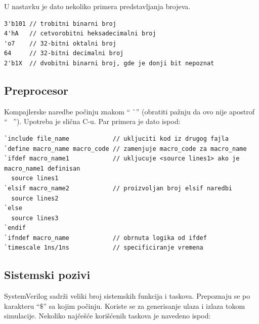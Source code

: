 U nastavku je dato nekoliko primera predstavljanja brojeva.

\begin{lstlisting}
3'b101 // trobitni binarni broj
4'hA   // cetvorobitni heksadecimalni broj
'o7    // 32-bitni oktalni broj
64     // 32-bitni decimalni broj
2'b1X  // dvobitni binarni broj, gde je donji bit nepoznat
\end{lstlisting}


\subsection{Preprocesor}

Kompajlerske naredbe počinju znakom `` \`\ '' (obratiti pažnju da ovo nije apostrof
`` \textquotesingle\ '').
Upotreba je slična C-u.
Par primera je dato ispod:

\begin{lstlisting}
`include file_name            // ukljuciti kod iz drugog fajla
`define macro_name macro_code // zamenjuje macro_code za macro_name
`ifdef macro_name1            // ukljucuje <source lines1> ako je macro_name1 definisan
  source lines1
`elsif macro_name2            // proizvoljan broj elsif naredbi
  source lines2
`else
  source lines3
`endif
`ifndef macro_name            // obrnuta logika od ifdef
`timescale 1ns/1ns            // specificiranje vremena
\end{lstlisting}


\subsection{Sistemski pozivi}

SystemVerilog sadrži veliki broj sistemskih funkcija i taskova.
Prepoznaju se po karakteru ``\(\$\)'' sa kojim počinju.
Koriste se za generisanje ulaza i izlaza tokom simulacije.
Nekoliko najčešće korišćenih taskova je navedeno ispod:

